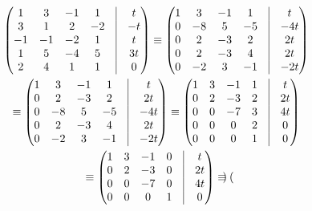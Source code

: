 \documentclass[12pt, a4paper]{article}
\begin{document}
    \begin{multline}
        \begin{pmatrix}
            1 & 3 & -1 & 1 & \vrule & t \\
            3 & 1 & 2 & -2 & \vrule & -t \\
            -1 & -1 & -2 & 1 & \vrule & t \\
            1 & 5 & -4 & 5 & \vrule & 3t \\
            2 & 4 & 1 & 1 & \vrule & 0
        \end{pmatrix} \equiv \begin{pmatrix}
            1 & 3 & -1 & 1 & \vrule & t \\
            0 & -8 & 5 & -5 & \vrule & -4t \\
            0 & 2 & -3 & 2 & \vrule & 2t \\
            0 & 2 & -3 & 4 & \vrule & 2t \\
            0 & -2 & 3 & -1 & \vrule & -2t
        \end{pmatrix} \\ \equiv \begin{pmatrix}
            1 & 3 & -1 & 1 & \vrule & t \\
            0 & 2 & -3 & 2 & \vrule & 2t \\
            0 & -8 & 5 & -5 & \vrule & -4t \\
            0 & 2 & -3 & 4 & \vrule & 2t \\
            0 & -2 & 3 & -1 & \vrule & -2t
        \end{pmatrix} \equiv \begin{pmatrix}
            1 & 3 & -1 & 1 & \vrule & t \\
            0 & 2 & -3 & 2 & \vrule & 2t \\
            0 & 0 & -7 & 3 & \vrule & 4t \\
            0 & 0 & 0 & 2 & \vrule & 0 \\
            0 & 0 & 0 & 1 & \vrule & 0
        \end{pmatrix} \\ \equiv \begin{pmatrix}
            1 & 3 & -1 & 0 & \vrule & t \\
            0 & 2 & -3 & 0 & \vrule & 2t \\
            0 & 0 & -7 & 0 & \vrule & 4t \\
            0 & 0 & 0  & 1 & \vrule & 0
        \end{pmatrix} \equiv \begin{pmatrix}

\end{pmatrix}
\end{multline}
\end{document}
